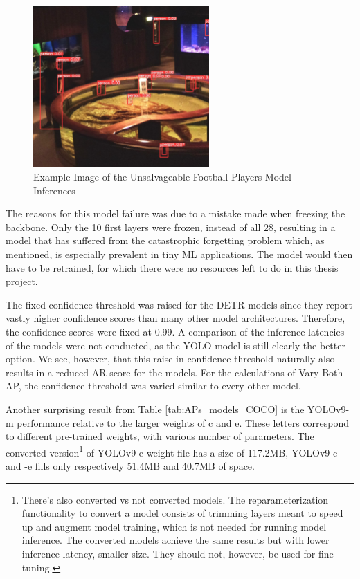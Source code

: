 \begin{figure}[H]
    \centering
    \includegraphics[width=0.6\textwidth]{Images/Results/football_unsalvageable.jpg}
    \caption{Example Image of the Unsalvageable Football Players Model Inferences}
    \label{fig:football_unsalvageable}
\end{figure}

The reasons for this model failure was due to a mistake made when freezing the backbone. Only the 10 first layers were frozen, instead of all 28, resulting in a model that has suffered from the catastrophic forgetting problem which, as mentioned, is especially prevalent in tiny ML applications. The model would then have to be retrained, for which there were no resources left to do in this thesis project.

The fixed confidence threshold was raised for the DETR models since they report vastly higher confidence scores than many other model architectures. Therefore, the confidence scores were fixed at 0.99. A comparison of the inference latencies of the models were not conducted, as the YOLO model is still clearly the better option. We see, however, that this raise in confidence threshold naturally also results in a reduced AR score for the models. For the calculations of Vary Both AP, the confidence threshold was varied similar to every other model.

Another surprising result from Table \ref{tab:APs_models_COCO} is the YOLOv9-m performance relative to the larger weights of c and e. These letters correspond to different pre-trained weights, with various number of parameters. The converted version\footnote{There's also converted vs not converted models. The reparameterization functionality to convert a model consists of trimming layers meant to speed up and augment model training, which is not needed for running model inference. The converted models achieve the same results but with lower inference latency, smaller size. They should not, however, be used for fine-tuning.} of YOLOv9-e weight file has a size of 117.2MB, YOLOv9-c and -e fills only respectively 51.4MB and 40.7MB of space.

